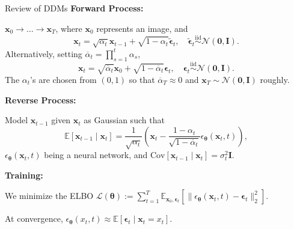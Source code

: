 \documentclass{beamer}
\def\E{\mathbb{E}}
\begin{document}
\begin{frame}[allowframebreaks]{Review of DDMs}
    \textbf{Forward Process:}

    \medskip

    $\mathbf{x}_0 \to \ldots \to \mathbf{x}_{T}$, where $\mathbf{x}_0$ represents an image, and
    \[
    \mathbf{x}_t = \sqrt{\alpha_t}\mathbf{x}_{t - 1} + \sqrt{1 - \alpha_t}\mathbf{\tilde{\epsilon}}_t, \quad \mathbf{\tilde{\epsilon}}_t \overset{\text{iid}}{\sim} \mathcal{N}(\mathbf{0}, \mathbf{I}).
    \]
    Alternatively, setting $\overline{\alpha}_t = \prod_{s = 1}^t \alpha_s$,
    \[
    \mathbf{x}_t = \sqrt{\overline{\alpha}_t}\mathbf{x}_0 + \sqrt{1 - \overline{\alpha}_t}\mathbf{\epsilon}_t, \quad \mathbf{\epsilon}_t \overset{\text{iid}}{\sim} \mathcal{N}(\mathbf{0}, \mathbf{I}).
    \]
    The $\alpha_t$'s are chosen from $(0, 1)$ so that $\overline{\alpha}_T \approx 0$ and $\mathbf{x}_T \sim \mathcal{N}(\mathbf{0}, \mathbf{I})$ roughly.

    \framebreak

    \textbf{Reverse Process:}

    \medskip

    Model $\mathbf{x}_{t - 1}$ given $\mathbf{x}_t$ as Gaussian such that
    \[
    \E[\mathbf{x}_{t - 1} \mid \mathbf{x}_t] = \frac{1}{\sqrt{\alpha_t}}\left(\mathbf{x}_t - \frac{1 - \alpha_t}{\sqrt{1 - \overline{\alpha}_t}}\epsilon_{\mathbf{\theta}}(\mathbf{x}_t, t)\right),
    \]
    $\epsilon_{\mathbf{\theta}}(\mathbf{x}_t, t)$ being a neural network, and $\text{Cov}[\mathbf{x}_{t - 1} \mid \mathbf{x}_t] = \sigma_t^2\mathbf{I}$.

    \medskip

    \textbf{Training:}

    \medskip

    We minimize the ELBO $\mathcal{L}(\mathbf{\theta}) := \sum_{t = 1}^T \E_{\mathbf{x}_0, \mathbf{\epsilon}_t}[\|\epsilon_{\mathbf{\theta}}(\mathbf{x}_t, t) - \mathbf{\epsilon}_t\|_2^2]$.

    \smallskip

    At convergence, $\epsilon_{\mathbf{\theta}}(x_t, t) \approx \E[\mathbf{\epsilon}_t \mid \mathbf{x}_t = x_t]$.
\end{frame}
\end{document}
